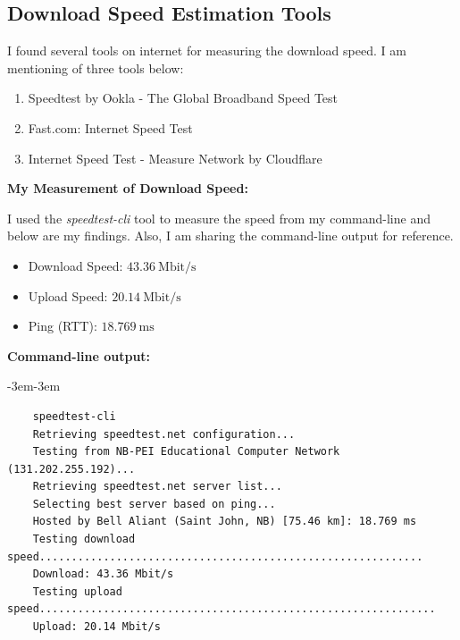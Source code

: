 \documentclass[12pt]{article}
\begin{document}
	\subsection{Download Speed Estimation Tools}
	
	I found several tools on internet for measuring the download speed. I am mentioning of three tools below:
	
	\begin{enumerate}
		\item Speedtest by Ookla - The Global Broadband Speed Test \cite{ookla}
		\item Fast.com: Internet Speed Test \cite{fast}
		\item Internet Speed Test - Measure Network by Cloudflare \cite{cloudflare}
	\end{enumerate}
	
	\noindent
	\textbf{My Measurement of Download Speed:}
	
	\noindent
	I used the \textit{speedtest-cli} tool to measure the speed from my command-line and below are my findings. Also, I am sharing the command-line output for reference.
	
	\begin{itemize}
		\item Download Speed: $43.36~\mathrm{Mbit/s}$
		\item Upload Speed: $20.14~\mathrm{Mbit/s}$
		\item Ping (RTT): $18.769~\mathrm{ms}$
	\end{itemize}
	
	\noindent
	\textbf{Command-line output:}
	\begin{adjustwidth}{-3em}{-3em}
	\begin{lstlisting}
	speedtest-cli 
	Retrieving speedtest.net configuration...
	Testing from NB-PEI Educational Computer Network (131.202.255.192)...
	Retrieving speedtest.net server list...
	Selecting best server based on ping...
	Hosted by Bell Aliant (Saint John, NB) [75.46 km]: 18.769 ms
	Testing download speed............................................................
	Download: 43.36 Mbit/s
	Testing upload speed..............................................................
	Upload: 20.14 Mbit/s	
	\end{lstlisting}	
	\end{adjustwidth}
		
	\section{}
	
\end{document}
